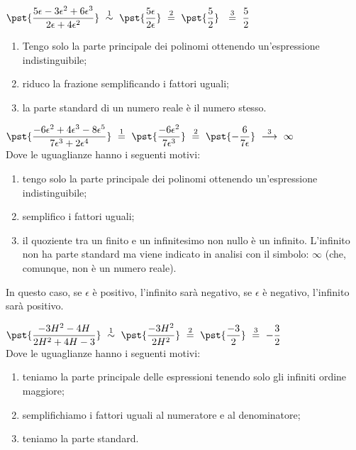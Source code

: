 \begin{esempio}
\(\pst{\dfrac{5\epsilon -3 \epsilon^2 + 6 \epsilon^3}
             {2\epsilon + 4 \epsilon^2}} 
~ \stackrel{1}{\sim} ~
  \pst{\dfrac{5 \epsilon}
             {2 \epsilon}} 
~ \stackrel{2}{=} ~
  \pst{\dfrac{5}
             {2}}~
~ \stackrel{3}{=} ~
  \dfrac{5}{2}\)\\

\begin{enumerate} [nosep]
 \item Tengo solo la parte principale dei polinomi ottenendo un'espressione 
indistinguibile;
 \item riduco la frazione semplificando i fattori uguali;
 \item la parte standard di un numero reale è il numero stesso.
\end{enumerate}
\end{esempio}

\begin{esempio}
\(\pst{\dfrac{-6\epsilon^2 +4 \epsilon^3 -8 \epsilon^5}
             {7\epsilon^3 + 2 \epsilon^4}} 
~ \stackrel{1}{=} ~
  \pst{\dfrac{-6\epsilon^2}
             {7\epsilon^3}} 
~ \stackrel{2}{=} ~
  \pst{-\dfrac{6}
             {7\epsilon}} 
~ \stackrel{3}{\longrightarrow} ~
  \infty\)\\

Dove le uguaglianze hanno i seguenti motivi:
\begin{enumerate} [nosep]
 \item tengo solo la parte principale dei polinomi ottenendo un'espressione 
indistinguibile;
 \item semplifico i fattori uguali;
 \item il quoziente tra un finito e un infinitesimo non nullo è un 
infinito. 
L'infinito non ha parte standard ma viene indicato in analisi con 
il simbolo: \(\infty\) (che, comunque, non è un numero reale).
\end{enumerate}
\begin{osservazione}
 In questo caso, se \(\epsilon\) è positivo, l'infinito sarà negativo, 
 se \(\epsilon\) è negativo, l'infinito sarà positivo.
\end{osservazione}
\end{esempio}

\begin{esempio}
\(\pst{\dfrac{-3H^2 -4H}
             {2H^2 +4H -3}} 
~ \stackrel{1}{\sim} ~
  \pst{\dfrac{-3H^2}
             {2H^2}} 
~ \stackrel{2}{=} ~
  \pst{\dfrac{-3}
             {2}} 
~ \stackrel{3}{=} ~
  -\dfrac{3}{2}\)\\

Dove le uguaglianze hanno i seguenti motivi:
\begin{enumerate} [nosep]
 \item teniamo la parte principale delle espressioni tenendo solo gli 
infiniti ordine maggiore; 
 \item semplifichiamo i fattori uguali al numeratore e al denominatore; 
 \item teniamo la parte standard.
\end{enumerate}
\end{esempio}

